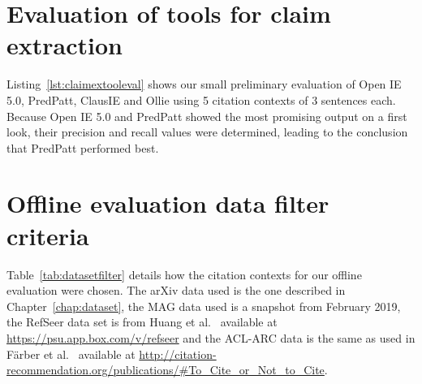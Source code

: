 

\chapter{Evaluation of tools for claim extraction}\label{chap:claimextooleval}

Listing~\ref{lst:claimextooleval} shows our small preliminary evaluation of Open IE 5.0, PredPatt, ClausIE and Ollie using 5 citation contexts of 3 sentences each. Because Open IE 5.0 and PredPatt showed the most promising output on a first look, their precision and recall values were determined, leading to the conclusion that PredPatt performed best.




\chapter{Offline evaluation data filter criteria}\label{chap:offlineevalfilter}

Table~\ref{tab:datasetfilter} details how the citation contexts for our offline evaluation were chosen. The arXiv data used is the one described in Chapter~\ref{chap:dataset}, the MAG data used is a snapshot from February 2019, the RefSeer data set is from Huang et al.~\cite{Huang2015} available at \url{https://psu.app.box.com/v/refseer} and the ACL-ARC data is the same as used in Färber et al.~\cite{Faerber2018b} available at \url{http://citation-recommendation.org/publications/#To_Cite_or_Not_to_Cite}.

